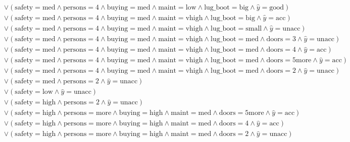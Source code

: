 \begin{scriptsize}
\[\begin{aligned}
  \\ & \lor (\text{safety}=\text{med} \land \text{persons}=\text{4} \land \text{buying}=\text{med} \land \text{maint}=\text{low} \land \text{lug_boot}=\text{big} \land \hat{y}=\text{good})
  \\ & \lor (\text{safety}=\text{med} \land \text{persons}=\text{4} \land \text{buying}=\text{med} \land \text{maint}=\text{vhigh} \land \text{lug_boot}=\text{big} \land \hat{y}=\text{acc})
  \\ & \lor (\text{safety}=\text{med} \land \text{persons}=\text{4} \land \text{buying}=\text{med} \land \text{maint}=\text{vhigh} \land \text{lug_boot}=\text{small} \land \hat{y}=\text{unacc})
  \\ & \lor (\text{safety}=\text{med} \land \text{persons}=\text{4} \land \text{buying}=\text{med} \land \text{maint}=\text{vhigh} \land \text{lug_boot}=\text{med} \land \text{doors}=\text{3} \land \hat{y}=\text{unacc})
  \\ & \lor (\text{safety}=\text{med} \land \text{persons}=\text{4} \land \text{buying}=\text{med} \land \text{maint}=\text{vhigh} \land \text{lug_boot}=\text{med} \land \text{doors}=\text{4} \land \hat{y}=\text{acc})
  \\ & \lor (\text{safety}=\text{med} \land \text{persons}=\text{4} \land \text{buying}=\text{med} \land \text{maint}=\text{vhigh} \land \text{lug_boot}=\text{med} \land \text{doors}=\text{5more} \land \hat{y}=\text{acc})
  \\ & \lor (\text{safety}=\text{med} \land \text{persons}=\text{4} \land \text{buying}=\text{med} \land \text{maint}=\text{vhigh} \land \text{lug_boot}=\text{med} \land \text{doors}=\text{2} \land \hat{y}=\text{unacc})
  \\ & \lor (\text{safety}=\text{med} \land \text{persons}=\text{2} \land \hat{y}=\text{unacc})
  \\ & \lor (\text{safety}=\text{low} \land \hat{y}=\text{unacc})
  \\ & \lor (\text{safety}=\text{high} \land \text{persons}=\text{2} \land \hat{y}=\text{unacc})
  \\ & \lor (\text{safety}=\text{high} \land \text{persons}=\text{more} \land \text{buying}=\text{high} \land \text{maint}=\text{med} \land \text{doors}=\text{5more} \land \hat{y}=\text{acc})
  \\ & \lor (\text{safety}=\text{high} \land \text{persons}=\text{more} \land \text{buying}=\text{high} \land \text{maint}=\text{med} \land \text{doors}=\text{4} \land \hat{y}=\text{acc})
  \\ & \lor (\text{safety}=\text{high} \land \text{persons}=\text{more} \land \text{buying}=\text{high} \land \text{maint}=\text{med} \land \text{doors}=\text{2} \land \hat{y}=\text{unacc})

\end{aligned}\]
\end{scriptsize}
